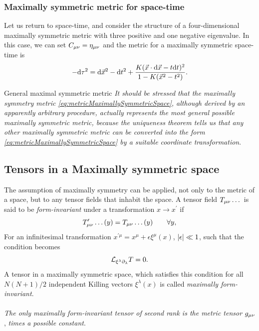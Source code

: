 \subsubsection{Maximally symmetric metric for space-time}
Let us return to space-time, and consider the structure of a four-dimensional maximally symmetric metric with three positive and one negative eigenvalue. In this case, we can set $C_{\mu \nu} = \eta_{\mu \nu}$ and the metric for a maximally symmetric space-time is
\begin{equation}
	\label{eq:maximallysymmetricSpaceTimemetric}
	- \mathrm{d} \tau^2 = \mathrm{d} \vec{x}^2 -\mathrm{d} t^2 + \frac{K (\vec{x}\cdot \mathrm{d} \vec{x} - t \mathrm{d} t)^2}{1-K(\vec{x}^2-t^2)}.
\end{equation}
\begin{mybox}{General maximal symmetric metric}
\emph{It should be stressed that the maximally symmetry metric \ref{eq:metricMaximallySymmetricSpace}, although derived by an apparently arbitrary procedure, actually represents the most general possible maximally symmetric metric, because the uniqueness theorem tells us that any other maximally symmetric metric can be converted into the form \ref{eq:metricMaximallySymmetricSpace} by a suitable coordinate transformation}.
\end{mybox}
\subsection{Tensors in a Maximally symmetric space}
The assumption of maximally symmetry can be applied, not only to the metric of a space, but to any tensor fields that inhabit the space. A tensor field $T_{\mu \nu}\dots$ is said to be \emph{form-invariant} under a transformation $x\rightarrow x^\prime$ if
\begin{equation}
	T^\prime_{\mu \nu}\dots (y) = T_{\mu \nu}\dots (y) \qquad \forall y,
\end{equation}
For an infinitesimal transformation $x^{\prime \mu} = x^\mu + \epsilon \xi^\mu(x)$, $\abs{\epsilon}\ll 1$, such that the condition becomes
\begin{equation}
	\mathcal{L}_{\xi^\lambda \partial_\lambda} T = 0.
\end{equation}
A tensor in a maximally symmetric space, which satisfies this condition for all $N(N+1)/2$ independent Killing vectors $\xi^\lambda(x)$ is called \emph{maximally form-invariant}.
\\
\\
\emph{The only maximally form-invariant tensor of second rank is the metric tensor} $g_{\mu \nu}$, \emph{times a possible constant}.
